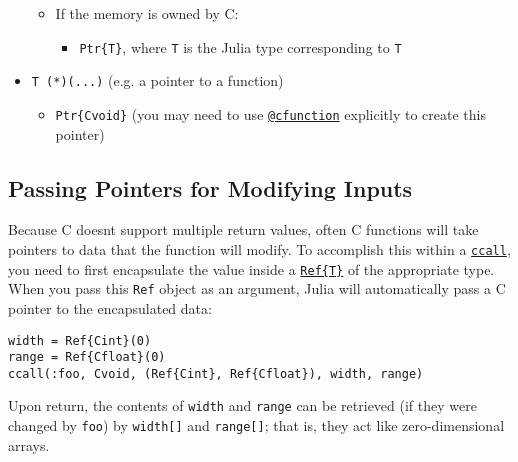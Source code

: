 \begin{itemize}
\begin{itemize}
\begin{itemize}
\end{itemize}

\item If the memory is owned by C:

\begin{itemize}
\item \texttt{Ptr\{T\}}, where \texttt{T} is the Julia type corresponding to \texttt{T}

\end{itemize}
\end{itemize}

\item \texttt{T (*)(...)} (e.g. a pointer to a function)

\begin{itemize}
\item \texttt{Ptr\{Cvoid\}} (you may need to use \hyperlink{11617107520401351255}{\texttt{@cfunction}} explicitly to create this pointer)

\end{itemize}
\end{itemize}


\hypertarget{12317000517353378133}{}


\subsection{Passing Pointers for Modifying Inputs}



Because C doesn{\textquotesingle}t support multiple return values, often C functions will take pointers to data that the function will modify. To accomplish this within a \hyperlink{14245046751182637566}{\texttt{ccall}}, you need to first encapsulate the value inside a \hyperlink{7936024700322877457}{\texttt{Ref\{T\}}} of the appropriate type. When you pass this \texttt{Ref} object as an argument, Julia will automatically pass a C pointer to the encapsulated data:




\begin{verbatim}
width = Ref{Cint}(0)
range = Ref{Cfloat}(0)
ccall(:foo, Cvoid, (Ref{Cint}, Ref{Cfloat}), width, range)
\end{verbatim}



Upon return, the contents of \texttt{width} and \texttt{range} can be retrieved (if they were changed by \texttt{foo}) by \texttt{width[]} and \texttt{range[]}; that is, they act like zero-dimensional arrays.




